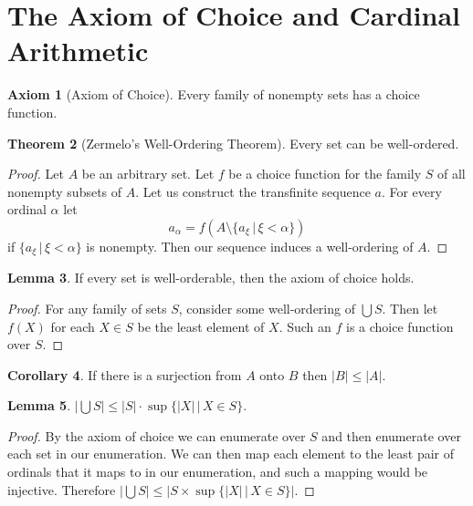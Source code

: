 \documentclass{article}
\theoremstyle{definition}
\newtheorem{thm}{Theorem}[section]
\newtheorem{crly}[thm]{Corollary}
\newtheorem{axm}[thm]{Axiom}
\newtheorem{lmma}[thm]{Lemma}
\newcommand{\abs}[1]{\lvert#1\rvert}
\begin{document}
\newpage

\section{The Axiom of Choice and Cardinal Arithmetic}

\begin{axm}[Axiom of Choice]
    Every family of nonempty sets has a choice function.
\end{axm}

\begin{thm}[Zermelo's Well-Ordering Theorem]
    Every set can be well-ordered.
\end{thm}

\begin{proof}
    Let $A$ be an arbitrary set. Let $f$ be a choice function for the family $S$ of all nonempty subsets of $A$. Let us construct the transfinite sequence $a$. For every ordinal $\alpha$ let
    \[
        a_\alpha = f(A \setminus \{a_\xi \, | \, \xi < \alpha\})    
    \] 
    if $\{a_\xi \, | \, \xi < \alpha\}$ is nonempty. Then our sequence induces a well-ordering of $A$.
\end{proof}

\begin{lmma}
    If every set is well-orderable, then the axiom of choice holds.
\end{lmma}

\begin{proof}
    For any family of sets $S$, consider some  well-ordering of $\bigcup S$. Then let $f(X)$ for each $X \in S$ be the least element of $X$. Such an $f$ is a choice function over $S$.
\end{proof}

\begin{crly}
    If there is a surjection from $A$ onto $B$ then $\abs{B} \le \abs{A}$.
\end{crly}

\begin{lmma}
    $\abs{\bigcup S} \le \abs{S} \cdot \sup\{\abs{X} \, | \, X \in S\}$.
\end{lmma}

\begin{proof}
    By the axiom of choice we can enumerate over $S$ and then enumerate over each set in our enumeration. We can then map each element to the least pair of ordinals that it maps to in our enumeration, and such a mapping would be injective. Therefore $\abs{\bigcup S} \le \abs{S \times \sup\{\abs{X} \, | \, X \in S\}}$.
\end{proof}
\end{document}
